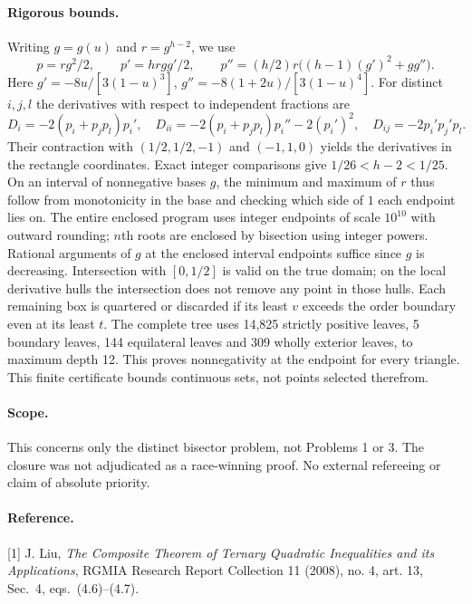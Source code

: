 \documentclass[11pt,a4paper]{article}
\numberwithin{equation}{section}
\theoremstyle{definition}
\theoremstyle{remark}
\begin{document}
\paragraph{Rigorous bounds.}
Writing $g=g(u)$ and $r=g^{h-2}$, we use
\[
 p=rg^2/2,\qquad p'=hrgg'/2,\qquad
 p''=(h/2)r\big((h-1)(g')^2+gg''\big).
\]
Here $g'=-8u/[3(1-u)^3]$, $g''=-8(1+2u)/[3(1-u)^4]$. For distinct $i,j,l$ the derivatives with respect to independent fractions are
\[
 D_i=-2(p_i+p_jp_l)p_i',\quad
 D_{ii}=-2(p_i+p_jp_l)p_i''-2(p_i')^2,\quad
 D_{ij}=-2p_i'p_j'p_l.
\]
Their contraction with $(1/2,1/2,-1)$ and $(-1,1,0)$ yields the derivatives in the rectangle coordinates. Exact integer comparisons give $1/26<h-2<1/25$. On an interval of nonnegative bases $g$, the minimum and maximum of $r$ thus follow from monotonicity in the base and checking which side of $1$ each endpoint lies on. The entire enclosed program uses integer endpoints of scale $10^{10}$ with outward rounding; $n$th roots are enclosed by bisection using integer powers. Rational arguments of $g$ at the enclosed interval endpoints suffice since $g$ is decreasing. Intersection with $[0,1/2]$ is valid on the true domain; on the local derivative hulls the intersection does not remove any point in those hulls. Each remaining box is quartered or discarded if its least $v$ exceeds the order boundary even at its least $t$. The complete tree uses 14,825 strictly positive leaves, 5 boundary leaves, 144 equilateral leaves and 309 wholly exterior leaves, to maximum depth 12. This proves nonnegativity at the endpoint for every triangle. This finite certificate bounds continuous sets, not points selected therefrom.

\paragraph{Scope.}
This concerns only the distinct bisector problem, not Problems 1 or 3. The closure was not adjudicated as a race-winning proof. No external refereeing or claim of absolute priority.
\paragraph{Reference.}
[1] J. Liu, \emph{The Composite Theorem of Ternary Quadratic Inequalities and its Applications}, RGMIA Research Report Collection 11 (2008), no. 4, art. 13, Sec.~4, eqs.~(4.6)--(4.7).
\end{document}
